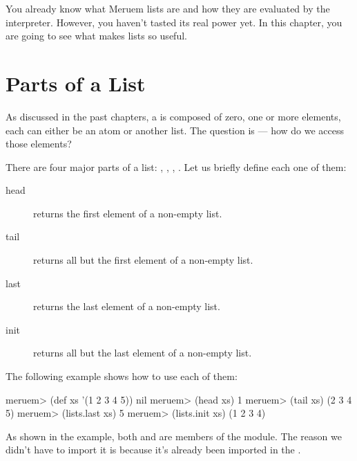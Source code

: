 You already know what Meruem lists are and how they are evaluated by the interpreter. However, you haven't tasted its real power yet. In this chapter, you are going to see what makes lists so useful.

\section{Parts of a List}
As discussed in the past chapters, a  is composed of zero, one or more elements, each can either be an atom or another list. The question is --- how do we access those elements? 

There are four major parts of a list: , , , . Let us briefly define each one of them:

\begin{description}
	\item[head] returns the first element of a non-empty list.
	\item[tail] returns all but the first element of a non-empty list.
	\item[last] returns the last element of a non-empty list.
	\item[init] returns all but the last element of a non-empty list.
\end{description}

The following example shows how to use each of them:

\begin{REPL}
meruem> (def xs '(1 2 3 4 5))
nil
meruem> (head xs)
1
meruem> (tail xs)
(2 3 4 5)
meruem> (lists.last xs)
5
meruem> (lists.init xs)
(1 2 3 4)
\end{REPL}

As shown in the example, both  and  are members of the  module. The reason we didn't have to import it is because it's already been imported in the .